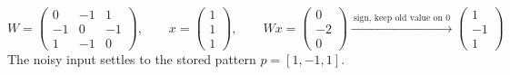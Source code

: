 \[
W = \begin{pmatrix} 0 & -1 & 1\\ -1 & 0 & -1\\ 1 & -1 & 0 \end{pmatrix},\qquad
x = \begin{pmatrix} 1\\ 1\\ 1 \end{pmatrix},\qquad
Wx = \begin{pmatrix} 0\\ -2\\ 0 \end{pmatrix} \xrightarrow{\ \text{sign, keep old value on } 0\ }
\begin{pmatrix} 1\\ -1\\ 1 \end{pmatrix}
\]
\noindent The noisy input settles to the stored pattern $p = [1, -1, 1]$.
